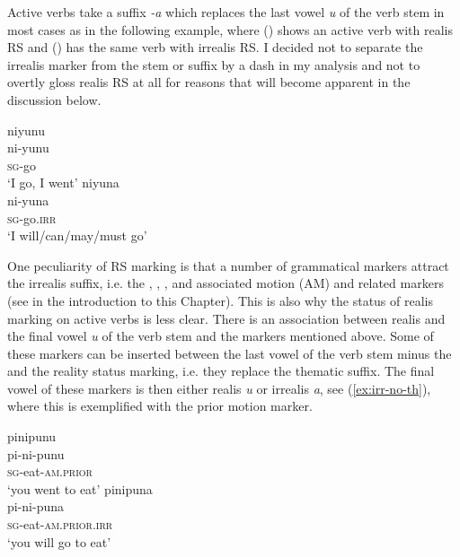 Active verbs take a suffix \textit{-a} which replaces the last vowel \textit{u} of the verb stem in most cases as in the following example, where () shows an active verb with realis RS and () has the same verb with irrealis RS. I decided not to separate the irrealis marker from the stem or suffix by a dash in my analysis and not to overtly gloss realis RS at all for reasons that will become apparent in the discussion below. 

\ea\label{ex:IRR-yunu}
  \ea\label{ex:IRR-yunu.1}
 \begingl 
\glpreamble niyunu\\
\gla ni-yunu\\ 
\textsc{sg}-go\\ 
\glft ‘I go, I went’
  \ex\label{ex:IRR-yunu.2}
 \begingl
\glpreamble niyuna\\
\gla ni-yuna\\
\textsc{sg}-go.\textsc{irr}\\
\glft ‘I will/can/may/must go’
\endgl
\z
\xe

One peculiarity of RS marking is that a number of grammatical markers attract the irrealis suffix, i.e. the , , , and associated motion  (AM) and related markers (see  in the introduction to this Chapter). This is also why the status of realis marking on active verbs is less clear. There is an association between realis and the final vowel \textit{u} of the verb stem and the markers mentioned above. Some of these markers can be inserted between the last vowel of the verb stem minus the  and the reality status marking, i.e. they replace the thematic suffix. The final vowel of these markers is then either realis \textit{u} or irrealis \textit{a}, see (\ref{ex:irr-no-th}), where this is exemplified with the prior motion marker.

\ea\label{ex:irr-no-th}
  \ea
\begingl
\glpreamble pinipunu\\
\gla pi-ni-punu\\
\textsc{sg}-eat-\textsc{am.prior}\\
\glft ‘you went to eat’
\endgl
  \ex
\begingl
\glpreamble pinipuna\\
\gla pi-ni-puna\\
\textsc{sg}-eat-\textsc{am.prior.irr}\\
\glft ‘you will go to eat’
\endgl
\z
\xe

